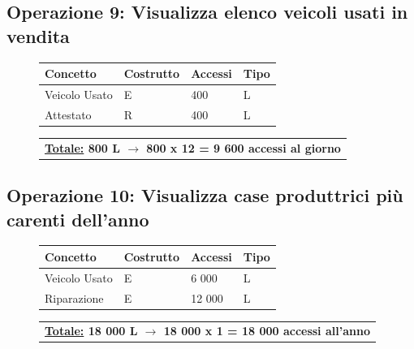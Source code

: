 \documentclass[a4paper,12pt]{report}
\begin{document}
\subsection*{Operazione 9: Visualizza elenco veicoli usati in vendita}
\begin{figure}[H]
	\centering
	\begin{tabular}{L{4.5cm}C{2cm}C{4.5cm}C{2cm}}
		\rule[-2mm]{0mm}{0.6cm}{}
		\textbf{Concetto} & \textbf{Costrutto} &\textbf{Accessi} & \textbf{Tipo} \\
		\hline\rule[-2mm]{0mm}{0.65cm}{}
		Veicolo Usato & E & 400 & L \\
		\hline\rule[-2mm]{0mm}{0.65cm}{}
		Attestato & R & 400 & L \\
	\end{tabular}
	
	\begin{tabular}{C{14.3cm}}
		\rule[-3mm]{0mm}{0.85cm}{}	
		 \textbf{\underline{Totale:} 800 L $\to$ 800 x 12 = 9 600 accessi al giorno}
	\end{tabular}
\end{figure}

\subsection*{Operazione 10: Visualizza case produttrici più carenti dell'anno}
\begin{figure}[H]
	\centering
	\begin{tabular}{L{4.5cm}C{2cm}C{4.5cm}C{2cm}}
		\rule[-2mm]{0mm}{0.6cm}{}
		\textbf{Concetto} & \textbf{Costrutto} &\textbf{Accessi} & \textbf{Tipo} \\
		\hline\rule[-2mm]{0mm}{0.65cm}{}
		Veicolo Usato & E & 6 000 & L \\
		\hline\rule[-2mm]{0mm}{0.65cm}{}
		Riparazione & E & 12 000 & L \\
	\end{tabular}
	
	\begin{tabular}{C{14.3cm}}
		\rule[-3mm]{0mm}{0.85cm}{}	
		 \textbf{\underline{Totale:} 18 000 L $\to$ 18 000 x 1 = 18 000 accessi all'anno}
	\end{tabular}
\end{figure}
\end{document}
